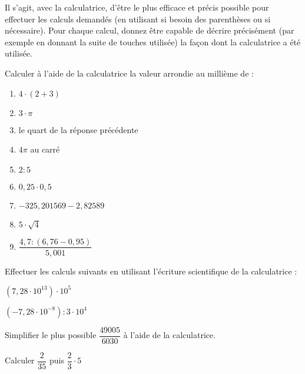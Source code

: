 \documentclass[a4paper,12pt]{article}
\begin{document}
\begin{activite}
 Il s'agit, avec la calculatrice, d'être le plus efficace et précis possible pour effectuer les calculs demandés (en utilisant si besoin des parenthèses ou si nécessaire). Pour chaque calcul, donnez être capable de décrire précisément (par exemple en donnant la suite de touches utilisée) la façon dont la calculatrice a été utilisée.

\begin{tasks}
\task Calculer à l'aide de la calculatrice la valeur arrondie au millième de :
\begin{multicols}{3}	
\begin{enumerate}
\item $4 \cdot (2 + 3)$
\item $3 \cdot \pi$
\item le quart de la réponse précédente
\item $4\pi$ au carré
\item $2 : 5$
\item $0,25 \cdot 0,5$
\item $-325,201569 - 2,82589$
\item $5 \cdot \sqrt{4}$
\item $\dfrac{4,7 : (6,76 - 0,95)}{5,001}$
\end{enumerate}
\end{multicols}

\task Effectuer les calculs suivants en utilisant l'écriture scientifique de la calculatrice :

\begin{inlineumerate}
\item $(7,28 \cdot 10^{13}) \cdot 10^5$
\item $(-7,28 \cdot 10^{-8}) : 3 \cdot 10^4$
\end{inlineumerate}

\task Simplifier le plus possible $\dfrac{49005}{6030}$ à l'aide de la calculatrice.

\task Calculer $\dfrac{2}{35}$ puis $\dfrac{2}{3} \cdot 5$
\end{tasks}
\end{activite}
\end{document}
